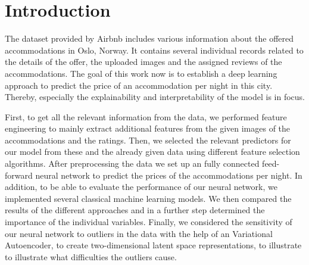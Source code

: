 \section{Introduction}



The dataset provided by Airbnb includes various information about the offered accommodations in Oslo, Norway. It contains several individual records related to the details of the offer, the uploaded images and the assigned reviews of the accommodations.
The goal of this work now is to establish a deep learning approach to predict the price of an accommodation per night in this city. Thereby, especially the explainability and interpretability of the model is in focus. 

First, to get all the relevant information from the data, we performed feature engineering to mainly extract additional features from the given images of the accommodations and the ratings. Then, we selected the relevant predictors for our model from these and the already given data using different feature selection algorithms. After preprocessing the data we set up an fully connected feed-forward neural network to predict the prices of the accommodations per night. In addition, to be able to evaluate the performance of our neural network, we implemented several classical machine learning models. We then compared the results of the different approaches and in a further step determined the importance of the individual variables. Finally, we considered the sensitivity of our neural network to outliers in the data with the help of an Variational Autoencoder, to create two-dimensional latent space representations, to illustrate to illustrate what difficulties the outliers cause.

